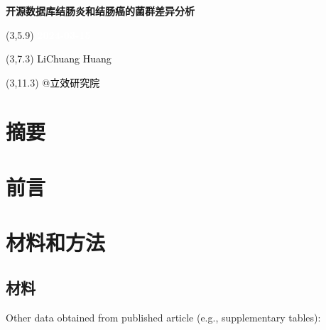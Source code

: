 \documentclass[
]{article}
\author{}
\date{\vspace{-2.5em}}
\begin{document}
\begin{titlepage} 
\begin{center} \textbf{\Huge
开源数据库结肠炎和结肠癌的菌群差异分析}
\vspace{4em} \begin{textblock}{10}(3,5.9) \huge
\textbf{\textcolor{white}{2024-03-15}}
\end{textblock} \begin{textblock}{10}(3,7.3)
\Large \textcolor{black}{LiChuang Huang}
\end{textblock} \begin{textblock}{10}(3,11.3)
\Large \textcolor{black}{@立效研究院}
\end{textblock} \end{center} \end{titlepage}
\restoregeometry


\tableofcontents

\listoffigures

\listoftables

\newpage


\hypertarget{abstract}{%
\section{摘要}\label{abstract}}

\hypertarget{introduction}{%
\section{前言}\label{introduction}}

\hypertarget{methods}{%
\section{材料和方法}\label{methods}}

\hypertarget{ux6750ux6599}{%
\subsection{材料}\label{ux6750ux6599}}

Other data obtained from published article (e.g., supplementary tables):
\end{document}

